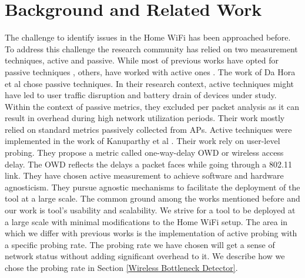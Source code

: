 \section{Background and Related Work}\label{Back_Related_Work}

The challenge to identify issues in the Home WiFi has been approached before. To address this challenge the research community has relied on two measurement techniques, active and passive. While most of previous works have opted for passive techniques \cite{hostview} \cite{passive_wifi_capacity_estimation}, others, have worked with active ones \cite{can_user_level_probing}. The work of Da Hora et al \cite{passive_wifi_capacity_estimation} chose passive techniques. In their research context, active techniques might have led to user traffic disruption and battery drain of devices under study. Within the context of passive metrics, they excluded per packet analysis as it can result in overhead during high network utilization periods. Their work mostly relied on standard metrics passively collected from APs. Active techniques were implemented in the work of Kanuparthy et al \cite{can_user_level_probing}. Their work rely on user-level probing. They propose a metric called one-way-delay OWD or wireless access delay. The OWD reflects the delays a packet faces while going through a 802.11 link. They have chosen active measurement to achieve software and hardware agnosticism. They pursue agnostic mechanisms to facilitate the deployment of the tool at a large scale. The common ground among the works mentioned before and our work is tool's usability and scalability. We strive for a tool to be deployed at a large scale with minimal modifications to the Home WiFi setup. The area in which we differ with previous works is the implementation of active probing with a specific probing rate. The probing rate we have chosen will get a sense of network status without adding significant overhead to it. We describe how we chose the probing rate in Section \ref{Wireless Bottleneck Detector}.
